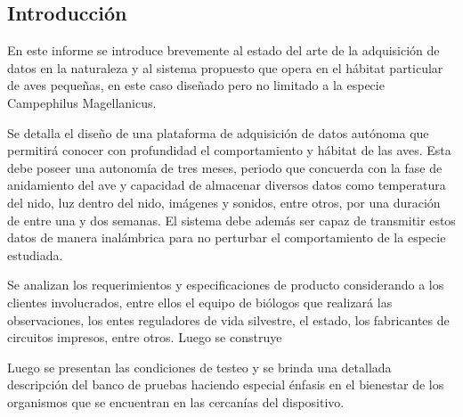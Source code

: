 



\subsection{Introducción}


En este informe se introduce brevemente al estado del arte de la adquisición de datos en la naturaleza y al sistema propuesto que opera en el hábitat particular de aves pequeñas, en este caso diseñado pero no limitado a la especie Campephilus Magellanicus. 

Se detalla el diseño de una plataforma de adquisición de datos autónoma que permitirá conocer con profundidad el comportamiento y hábitat de las aves. Esta debe poseer una autonomía de tres meses, periodo que concuerda con la fase de anidamiento del ave y capacidad de almacenar diversos datos como temperatura del nido, luz dentro del nido, imágenes y sonidos, entre otros, por una duración de entre una y dos semanas. El sistema debe además ser capaz de transmitir estos datos de manera inalámbrica para no perturbar el comportamiento de la especie estudiada.

Se analizan los requerimientos y especificaciones de producto considerando a los clientes involucrados, entre ellos el equipo de biólogos que realizará las observaciones, los entes reguladores de vida silvestre, el estado, los fabricantes de circuitos impresos, entre otros. Luego se construye

Luego se presentan las condiciones de testeo y se brinda una detallada descripción del banco de pruebas haciendo especial énfasis en el bienestar de los organismos que se encuentran en las cercanías del dispositivo.




